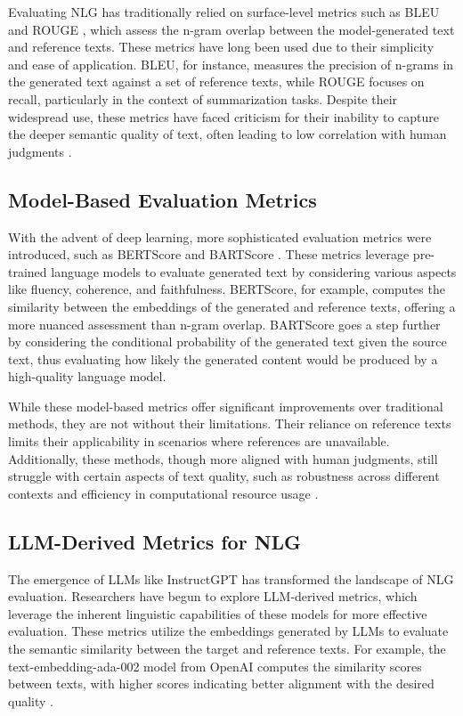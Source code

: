 Evaluating NLG has traditionally relied on surface-level metrics such as BLEU \cite{papineni2002bleu} and ROUGE \cite{lin2004rouge}, which assess the n-gram overlap between the model-generated text and reference texts. These metrics have long been used due to their simplicity and ease of application. BLEU, for instance, measures the precision of n-grams in the generated text against a set of reference texts, while ROUGE focuses on recall, particularly in the context of summarization tasks. Despite their widespread use, these metrics have faced criticism for their inability to capture the deeper semantic quality of text, often leading to low correlation with human judgments \cite{sulem2018bleu}.

\subsection{Model-Based Evaluation Metrics}

With the advent of deep learning, more sophisticated evaluation metrics were introduced, such as BERTScore and BARTScore \cite{zhang2019bertscore, yuan2021bartscore}. These metrics leverage pre-trained language models to evaluate generated text by considering various aspects like fluency, coherence, and faithfulness. BERTScore, for example, computes the similarity between the embeddings of the generated and reference texts, offering a more nuanced assessment than n-gram overlap. BARTScore goes a step further by considering the conditional probability of the generated text given the source text, thus evaluating how likely the generated content would be produced by a high-quality language model.

While these model-based metrics offer significant improvements over traditional methods, they are not without their limitations. Their reliance on reference texts limits their applicability in scenarios where references are unavailable. Additionally, these methods, though more aligned with human judgments, still struggle with certain aspects of text quality, such as robustness across different contexts and efficiency in computational resource usage \cite{he2022blind}.

\subsection{LLM-Derived Metrics for NLG}

The emergence of LLMs like InstructGPT \cite{ouyang2022training} has transformed the landscape of NLG evaluation. Researchers have begun to explore LLM-derived metrics, which leverage the inherent linguistic capabilities of these models for more effective evaluation. These metrics utilize the embeddings generated by LLMs to evaluate the semantic similarity between the target and reference texts. For example, the text-embedding-ada-002 model from OpenAI computes the similarity scores between texts, with higher scores indicating better alignment with the desired quality \cite{es2023ragas}.

